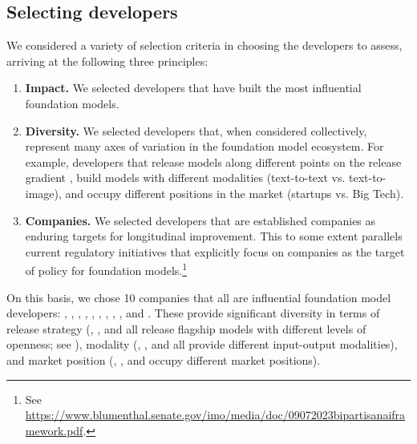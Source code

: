 \hypertarget{developer-selection}{\subsection{Selecting developers}}
\label{sec:developer-selection}
We considered a variety of selection criteria in choosing the \numcompanies developers to assess, arriving at the following three principles:
\begin{enumerate}
    \item \textbf{Impact.} We selected developers that have built the most influential foundation models.
    \item \textbf{Diversity.} We selected developers that, when considered collectively, represent many axes of variation in the foundation model ecosystem. For example, developers that release models along different points on the release gradient \cite[\eg open vs. closed,][]{solaiman2023gradient}, build models with different modalities (\eg text-to-text vs. text-to-image), and occupy different positions in the market (\eg startups vs. Big Tech). 
    \item \textbf{Companies.} 
    We selected developers that are established companies as enduring targets for longitudinal improvement. 
    This to some extent parallels current regulatory initiatives that explicitly focus on companies as the target of policy for foundation models.\footnote{See \url{https://www.blumenthal.senate.gov/imo/media/doc/09072023bipartisanaiframework.pdf}.} 
\end{enumerate}
On this basis, we chose 10 companies that all are influential foundation model developers: 
\aitwentyone, \amazon, \anthropic, \cohere, \google, \huggingface, \inflection, \meta, \openai, and \stability.
These \numcompanies provide significant diversity in terms of release strategy (\eg \anthropic, \meta, and \huggingface all release flagship models with different levels of openness; see ), modality (\eg \cohere, \openai, and \stability all provide different input-output modalities), and market position (\eg \google, \inflection, and \openai occupy different market positions).

